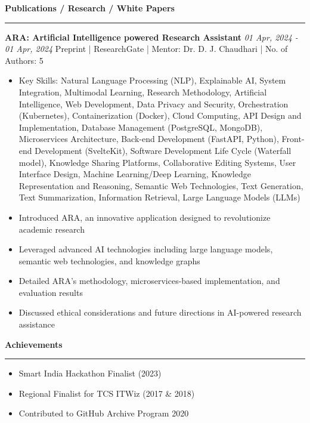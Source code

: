 \documentclass[a4paper,11pt]{article}
\renewcommand{\section}[1]{\vspace{0.5em}\textbf{\Large #1}\vspace{0.2em}\hrule\vspace{0.5em}}
\renewcommand{\subsection}[1]{\vspace{0.3em}\textbf{\large #1}\vspace{0.2em}}
\newcommand{\daterange}[2]{\textit{#1 - #2}}
\begin{document}
\section{Publications / Research / White Papers}
\subsection{ARA: Artificial Intelligence powered Research Assistant}
\daterange{01 Apr, 2024}{01 Apr, 2024}
Preprint | ResearchGate | Mentor: Dr. D. J. Chaudhari | No. of Authors: 5
\begin{itemize}
    \item Key Skills: Natural Language Processing (NLP), Explainable AI, System Integration, Multimodal Learning, Research Methodology, Artificial Intelligence, Web Development, Data Privacy and Security, Orchestration (Kubernetes), Containerization (Docker), Cloud Computing, API Design and Implementation, Database Management (PostgreSQL, MongoDB), Microservices Architecture, Back-end Development (FastAPI, Python), Front-end Development (SvelteKit), Software Development Life Cycle (Waterfall model), Knowledge Sharing Platforms, Collaborative Editing Systems, User Interface Design, Machine Learning/Deep Learning, Knowledge Representation and Reasoning, Semantic Web Technologies, Text Generation, Text Summarization, Information Retrieval, Large Language Models (LLMs)
    \item Introduced ARA, an innovative application designed to revolutionize academic research
    \item Leveraged advanced AI technologies including large language models, semantic web technologies, and knowledge graphs
    \item Detailed ARA's methodology, microservices-based implementation, and evaluation results
    \item Discussed ethical considerations and future directions in AI-powered research assistance
\end{itemize}

\section{Achievements}
\begin{itemize}
    \item Smart India Hackathon Finalist (2023)
    \item Regional Finalist for TCS ITWiz (2017 \& 2018)
    \item Contributed to GitHub Archive Program 2020
\end{itemize}
\end{document}
